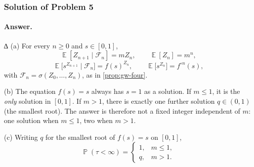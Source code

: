 \documentclass[11pt,a4paper]{article}
\DeclareMathOperator{\E}{\mathbb{E}}
\DeclareMathOperator{\Pbb}{\mathbb{P}}
\begin{document}
\subsubsection{Solution of Problem 5}

\paragraph{Answer.}
∆
(a) For every \(n\ge 0\) and \(s\in[0,1]\),
\[
\E[Z_{n+1}\mid\mathcal{F}_n]=mZ_n,
\qquad
\E[Z_n]=m^n,
\]
\[
\E\bigl[s^{Z_{n+1}}\mid\mathcal{F}_n\bigr]=f(s)^{Z_n},
\qquad
\E\bigl[s^{Z_n}\bigr]=f^{\circ n}(s),
\]
with \(\mathcal{F}_n=\sigma(Z_0,\dots,Z_n)\), as in \cref{prop:gw-four}.

(b) The equation \(f(s)=s\) always has \(s=1\) as a solution. If \(m\le 1\), it is the \emph{only} solution in \([0,1]\). If \(m>1\), there is exactly one further solution \(q\in(0,1)\) (the smallest root). The answer is therefore not a fixed integer independent of \(m\): one solution when \(m\le 1\), two when \(m>1\).

(c) Writing \(q\) for the smallest root of \(f(s)=s\) on \([0,1]\),
\[
\Pbb(\tau<\infty)
=
\begin{cases}
1, & m\le 1,\\
q, & m>1.
\end{cases}
\]
\end{document}

